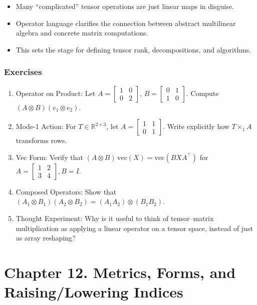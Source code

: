 \documentclass[
  letterpaper,
  DIV=11,
  numbers=noendperiod]{scrreprt}
\providecommand{\tightlist}{%
  \setlength{\itemsep}{0pt}\setlength{\parskip}{0pt}}
\begin{document}
\begin{itemize}
\tightlist
\item
  Many ``complicated'' tensor operations are just linear maps in
  disguise.
\item
  Operator language clarifies the connection between abstract
  multilinear algebra and concrete matrix computations.
\item
  This sets the stage for defining tensor rank, decompositions, and
  algorithms.
\end{itemize}

\subsubsection{Exercises}\label{exercises-42}

\begin{enumerate}
\def\labelenumi{\arabic{enumi}.}
\item
  Operator on Product: Let
  \(A = \begin{bmatrix}1 & 0 \\ 0 & 2\end{bmatrix}\),
  \(B = \begin{bmatrix}0 & 1 \\ 1 & 0\end{bmatrix}\). Compute
  \((A \otimes B)(e_1 \otimes e_2)\).
\item
  Mode-1 Action: For \(T \in \mathbb{R}^{2 \times 3}\), let
  \(A = \begin{bmatrix}1 & 1 \\ 0 & 1\end{bmatrix}\). Write explicitly
  how \(T \times_1 A\) transforms rows.
\item
  Vec Form: Verify that
  \((A \otimes B)\,\mathrm{vec}(X) = \mathrm{vec}(BXA^\top)\) for
  \(A = \begin{bmatrix}1 & 2 \\ 3 & 4\end{bmatrix}, B = I\).
\item
  Composed Operators: Show that
  \((A_1 \otimes B_1)(A_2 \otimes B_2) = (A_1A_2) \otimes (B_1B_2)\).
\item
  Thought Experiment: Why is it useful to think of tensor--matrix
  multiplication as applying a linear operator on a tensor space,
  instead of just as array reshaping?
\end{enumerate}

\section{Chapter 12. Metrics, Forms, and Raising/Lowering
Indices}\label{chapter-12.-metrics-forms-and-raisinglowering-indices}
\end{document}
